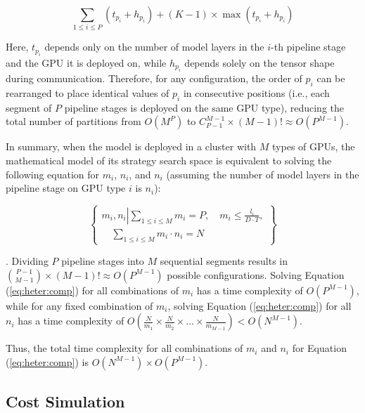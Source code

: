 \begin{equation}
\label{eq:heter:def}
    \sum_{1 \leq i \leq P} (t_{p_i} + h_{p_i}) + (K - 1) \times \max(t_{p_i} + h_{p_i})
\end{equation}

Here, $t_{p_i}$ depends only on the number of model layers in the $i$-th pipeline stage and the GPU it is deployed on, while $h_{p_i}$ depends solely on the tensor shape during communication. Therefore, for any configuration, the order of $p_i$ can be rearranged to place identical values of $p_i$ in consecutive positions (i.e., each segment of $P$ pipeline stages is deployed on the same GPU type), reducing the total number of partitions from $O(M^P)$ to $C_{P-1}^{M-1} \times (M-1)! \approx O(P^{M-1})$.

In summary, when the model is deployed in a cluster with $M$ types of GPUs, the mathematical model of its strategy search space is equivalent to solving the following equation for $m_i$, $n_i$, and $n_i$ (assuming the number of model layers in the pipeline stage on GPU type $i$ is $n_i$):

\begin{equation}
\label{eq:heter:comp}
\left\{
\begin{array}{l}
m_i, n_i \left| \sum_{1 \leq i \leq M} m_i = P, \quad m_i \leq \frac{l_i}{D \cdot T}, \right. \\
\left. \quad \sum_{1 \leq i \leq M} m_i \cdot n_i = N \right.
\end{array}
\right\}
\end{equation}


. Dividing $P$ pipeline stages into $M$ sequential segments results in $\binom{P-1}{M-1} \times (M-1)! \approx O(P^{M-1})$ possible configurations. Solving Equation (\ref{eq:heter:comp}) for all combinations of $m_i$ has a time complexity of $O(P^{M-1})$, while for any fixed combination of $m_i$, solving Equation (\ref{eq:heter:comp}) for all $n_i$ has a time complexity of $O\left(\frac{N}{m_1} \times \frac{N}{m_2} \times \dots \times \frac{N}{m_{M-1}}\right) < O(N^{M-1})$.

Thus, the total time complexity for all combinations of $m_i$ and $n_i$ for Equation (\ref{eq:heter:comp}) is $O(N^{M-1}) \times O(P^{M-1})$.


\subsection{Cost Simulation}\label{sec:scheme:cost}


